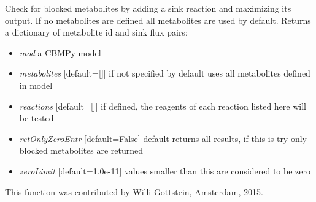 \documentclass[a4paper,11pt,english]{sphinxmanual}
\begin{document}
\begin{fulllineitems}
\label{modules_doc:cbmpy.CBTools.checkProducibility}
Check for blocked metabolites by adding a sink reaction and maximizing its output. If no metabolites
are defined all metabolites are used by default. Returns a dictionary of metabolite
id and sink flux pairs:
\begin{itemize}
\item {} 
\emph{mod} a CBMPy model

\item {} 
\emph{metabolites} {[}default={[}{]}{]} if not specified by default uses all metabolites defined in model

\item {} 
\emph{reactions} {[}default={[}{]}{]} if defined, the reagents of each reaction listed here will be tested

\item {} 
\emph{retOnlyZeroEntr} {[}default=False{]} default returns all results, if this is try only blocked metabolites are returned

\item {} 
\emph{zeroLimit} {[}default=1.0e-11{]} values smaller than this are considered to be zero

\end{itemize}

This function was contributed by Willi Gottstein, Amsterdam, 2015.

\end{fulllineitems}

\end{document}
